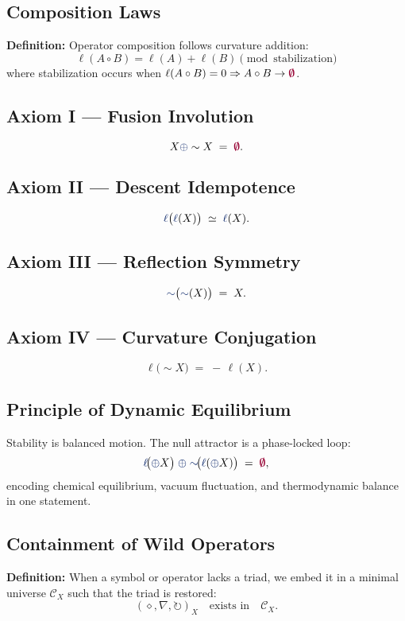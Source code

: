 \subsection{Composition Laws}
\textbf{Definition:} Operator composition follows curvature addition:
\[
\ell(A \circ B) = \ell(A) + \ell(B) \pmod{\text{stabilization}}
\]
where stabilization occurs when $\ell(A \circ B) = 0 \Rightarrow A \circ B \to \void$.

\subsection{Axiom I — Fusion Involution}
\[
X \fuse \sim X \;=\; \void.
\]

\subsection{Axiom II — Descent Idempotence}
\[
\lha\bigl(\lha(X)\bigr) \;\simeq\; \lha(X).
\]

\subsection{Axiom III — Reflection Symmetry}
\[
\reflec\bigl(\reflec(X)\bigr) \;=\; X.
\]

\subsection{Axiom IV — Curvature Conjugation}
\[
\ell\!\bigl(\sim X\bigr) \;=\; -\,\ell(X).
\]

\subsection{Principle of Dynamic Equilibrium}

Stability is balanced motion.  The null attractor is a phase-locked loop:
\[
\lha\!\bigl(\fuse X\bigr)
   \;\fuse\;
\reflec\!\bigl(\lha(\fuse X)\bigr)
   \;=\;
\void,
\]
encoding chemical equilibrium, vacuum fluctuation, and thermodynamic balance
in one statement.

\subsection{Containment of Wild Operators}

\textbf{Definition:} When a symbol or operator lacks a triad, we embed it in a minimal universe
$\mathcal{C}_X$ such that the triad is restored:
\[
(\diamond,\nabla,\circlearrowright)_{X}
\quad\text{exists in}\quad
\mathcal{C}_X.
\]

